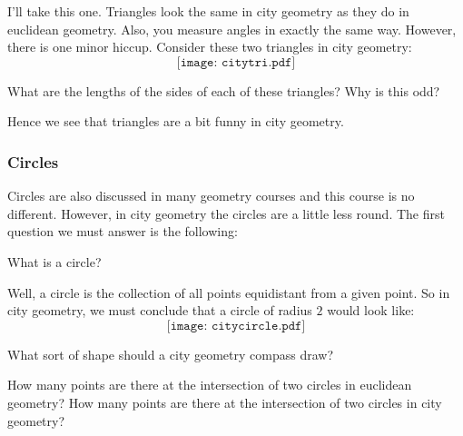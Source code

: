 \documentclass{ximera}
\begin{document}
I'll take this one. Triangles look the same in city geometry as they
do in euclidean geometry. Also, you measure angles in exactly the same
way. However, there is one minor hiccup. Consider these two triangles
in city geometry:
\[
\texttt{[image: citytri.pdf]}
\]
\begin{question} 
What are the lengths of the sides of each of these triangles? Why is
this odd?
\end{question}
 

Hence we see that triangles are a bit funny in city geometry.

\subsubsection{Circles}

Circles are also discussed in many geometry courses and this course is
no different. However, in city geometry the circles are a little less
round. The first question we must answer is the following:

\begin{question} What is a circle?
\end{question}

Well, a circle is the collection of all points equidistant from a
given point. So in city geometry, we must conclude that a circle of
radius $2$ would look like:
\[
\texttt{[image: citycircle.pdf]}
\]
\begin{question} What sort of shape should a city geometry compass draw?
\end{question}


\begin{question} 
How many points are there at the intersection of two circles in
euclidean geometry? How many points are there at the intersection of
two circles in city geometry?
\end{question}
\end{document}
